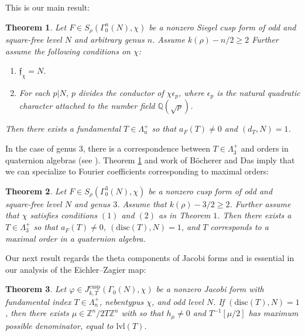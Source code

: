 \documentclass[11pt]{article}
\newtheorem{theorem}{Theorem}[section]
\theoremstyle{definition}
\theoremstyle{remark}
\newcommand{\Q}{\mathbb{Q}}
\newcommand{\Z}{\mathbb{Z}}
\newcommand{\disc}{\text{disc}}
\begin{document}
This is our main result: \\

\begin{theorem}\label{3.1}
    Let $F \in S_\rho(\Gamma_0^n(N), \chi)$ be a nonzero Siegel cusp form of odd and square-free level $N$ and arbitrary genus $n$. Assume $k(\rho) - n/2 \geq 2$ Further assume the following conditions on $\chi$:



\begin{enumerate}

\item $\mathfrak{f}_\chi = N$. 

\item For each $p \vert N$, $p$ divides the conductor of $\chi \epsilon_p$, where $\epsilon_p$ is the natural quadratic character attached to the number field $\Q(\sqrt{p})$. 

\end{enumerate}

Then there exists a fundamental $T \in \Lambda_n^+$ so that $a_F(T) \neq 0$ and $(d_T,N) = 1$.

\end{theorem}

In the case of genus $3$, there is a correspondence between $T \in \Lambda_3^+$ and orders in quaternion algebras (see \cite{BD}). Theorem \ref{3.1} and work of B\"ocherer and Das imply that we can specialize to Fourier coefficients corresponding to maximal orders: \\

\begin{theorem}\label{3.2}
    Let $F \in S_\rho(\Gamma_0^3(N), \chi)$ be a nonzero cusp form of odd and square-free level $N$ and genus $3$. Assume that $k(\rho) - 3/2\geq 2$. Further assume that $\chi$ satisfies conditions $(1)$ and $(2)$ as in Theorem $1$. Then there exists a $T  \in \Lambda_3^+$ so that $a_F(T) \neq 0$, $(\text{disc}(T),N) = 1$, and $T$ corresponds to a maximal order in a quaternion algebra. 
\end{theorem} 

Our next result regards the theta components of Jacobi forms and is essential in our analysis of the Eichler--Zagier map: \\

\begin{theorem}\label{3.3}
    Let $\varphi \in J^{\text{cusp}}_{k, T}(\Gamma_0(N),\chi)$ be a nonzero Jacobi form with fundamental index $T \in \Lambda_n^+$, nebentypus $\chi$, and odd level $N$. If $(\disc(T),N) = 1$, then there exists $\mu \in \Z^n/2T\Z^n$ with so that $h_\mu \neq 0$ and $T^{-1}[\mu/2]$ has maximum possible denominator, equal to $\mathrm{lvl}(T)$.
\end{theorem} 
\end{document}
